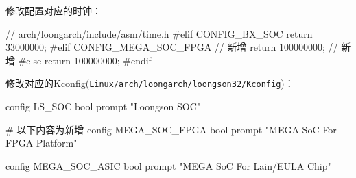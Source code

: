 修改配置对应的时钟：

\begin{CodeBlock}[language=BookC]
// arch/loongarch/include/asm/time.h
#elif CONFIG_BX_SOC
    return 33000000;
#elif CONFIG_MEGA_SOC_FPGA // 新增
    return 100000000; // 新增
#else
    return 100000000;
#endif
\end{CodeBlock}

修改对应的Kconfig(\texttt{Linux/arch/loongarch/loongson32/Kconfig})：

\begin{CodeBlock}[language=BookConfig]
config LS_SOC
    bool
    prompt "Loongson SOC"

# 以下内容为新增
config MEGA_SOC_FPGA
    bool
    prompt "MEGA SoC For FPGA Platform"

config MEGA_SOC_ASIC
    bool
    prompt "MEGA SoC For Lain/EULA Chip"
\end{CodeBlock}

